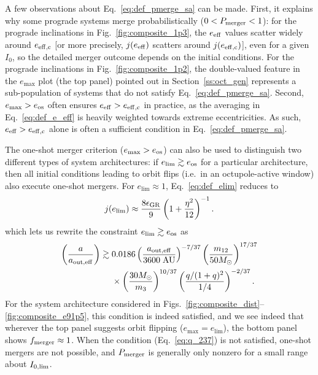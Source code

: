 \documentclass[
        fleqn,
        usenatbib,
    ]{mnras}
\newcommand*{\p}[1]{\left(#1\right)}
\begin{document}
A few observations about Eq.~\eqref{eq:def_pmerge_sa} can be made. First, it
explains why some prograde systems merge probabilistically ($0 < P_{\rm merger}
< 1$): for the prograde inclinations in Fig.~\ref{fig:composite_1p3},
the $e_{\rm eff}$ values scatter widely around $e_{\rm eff,c}$ [or more
precisely, $j(e_{\rm eff})$ scatters around $j(e_{\rm eff,c})$], even for a
given $I_0$, so the detailed merger outcome depends on the initial conditions.
For the prograde inclinations in Fig.~\ref{fig:composite_1p2}, the double-valued
feature in the $e_{\max}$ plot (the top panel) pointed out in
Section~\ref{ss:oct_gen} represents a sub-population of systems that do not
satisfy Eq.~\eqref{eq:def_pmerge_sa}. Second, $e_{\max} > e_{\rm os}$ often
ensures $e_{\rm eff} > e_{\rm eff, c}$ in practice, as the averaging in
Eq.~\eqref{eq:def_e_eff} is heavily weighted towards extreme eccentricities. As
such, $e_{\rm eff} > e_{\rm eff, c}$ alone is often a sufficient condition in
Eq.~\eqref{eq:def_pmerge_sa}.

The one-shot merger criterion ($e_{\max} > e_{\rm os}$) can also be used to distinguish two different
types of system architectures: if $e_{\lim} \gtrsim e_{\rm os}$ for a particular
architecture, then all initial conditions leading to orbit flips (i.e.\ in an
octupole-active window) also execute one-shot mergers. For $e_{\lim} \approx
1$, Eq.~\eqref{eq:def_elim} reduces to
\begin{equation}
    j(e_{\lim}) \approx \frac{8\epsilon_{\rm GR}}{9}\p{1 +
        \frac{\eta^2}{12}}^{-1}.
\end{equation}
which lets us rewrite the constraint $e_{\lim} \gtrsim e_{\rm os}$ as
\begin{align}
    \p{\frac{a}{a_{\rm out, eff}}} \gtrsim{}&
        0.0186
        \p{\frac{a_{\rm out, eff}}{3600\;\mathrm{AU}}}^{-7/37}
        \p{\frac{m_{12}}{50M_{\odot}}}^{17/37}\nonumber\\
        &\times\p{\frac{30M_{\odot}}{m_3}}^{10/37}
        \p{\frac{q / (1 + q)^2}{1/4}}^{-2/37}.\label{eq:q_237}
\end{align}
For the system architecture considered in
Figs.~\ref{fig:composite_dist}--\ref{fig:composite_e91p5}, this condition is
indeed satisfied, and we see indeed that wherever the top panel suggests orbit
flipping ($e_{\max} = e_{\lim}$), the bottom panel shows $f_{\rm merger} \approx
1$. When the condition (Eq.~\ref{eq:q_237}) is not satisfied, one-shot mergers are
not possible, and $P_{\rm merger}$ is generally only nonzero for a small range
about $I_{\rm 0, \lim}$.
\end{document}
